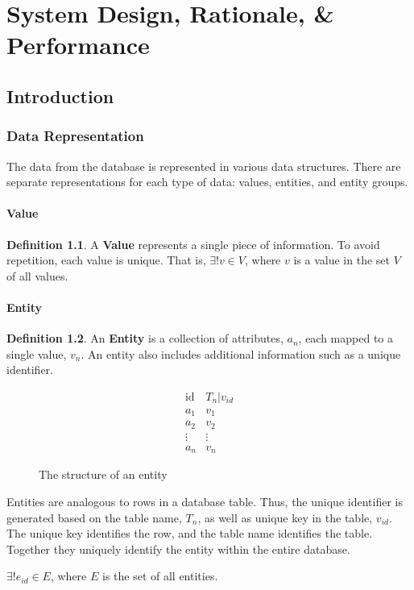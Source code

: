 \documentclass[12pt,letterpaper,oneside,draft]{report}
\theoremstyle{definition}
\newtheorem{defn}{Definition}
\begin{document}
	\chapter{System Design, Rationale, \& Performance}
		\section{Introduction}
			\subsection{Data Representation}
				The data from the database is represented in various data structures.  There are separate representations for each type of data:  values, entities, and entity groups.

				\subsubsection{Value}
					\begin{defn}
						A \textbf{Value} represents a single piece of information.  To avoid repetition, each value is unique.  That is, $\exists! v \in V$, where $v$ is a value in the set $V$ of all values.
					\end{defn}

				\subsubsection{Entity}
					\begin{defn}
						An \textbf{Entity} is a collection of attributes, $a_n$, each mapped to a single value, $v_n$.  An entity also includes additional information such as a unique identifier.

						\begin{figure}[!ht]
							\centering
							\[
								\begin{array}{ll}
									\mathrm{id} & T_n|v_{id} \\
									a_1 & v_1 \\
									a_2 & v_2 \\
									\vdots & \vdots \\
									a_n & v_n
								\end{array}
							\]
							\caption{The structure of an entity}
							\label{fig:entity-rep}
						\end{figure}

						Entities are analogous to rows in a database table.  Thus, the unique identifier is generated based on the table name, $T_n$, as well as unique key in the table, $v_{id}$.  The unique key identifies the row, and the table name identifies the table.  Together they uniquely identify the entity within the entire database.

						$\exists! e_{id} \in E$, where $E$ is the set of all entities.
					\end{defn}
\end{document}
